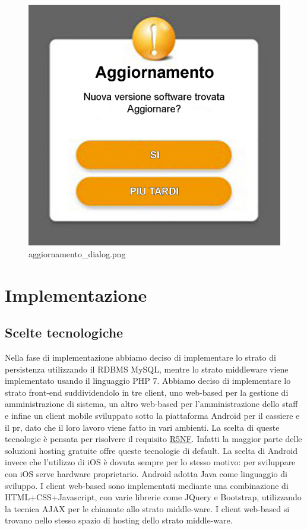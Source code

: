 \documentclass[a4paper]{article}
\begin{document}
\begin{figure}[H]
    \includegraphics[scale=0.5]{Progettazione/aggiornamento_dialog.png}
    \centering
    \caption{aggiornamento\_dialog.png}
\end{figure}


\newpage

\section{Implementazione}

\subsection{Scelte tecnologiche}

Nella fase di implementazione abbiamo deciso di implementare lo strato di persistenza utilizzando il RDBMS MySQL, mentre lo strato middleware viene implementato usando il linguaggio PHP 7. Abbiamo deciso di implementare lo strato front-end suddividendolo in tre client, uno web-based per la gestione di amministrazione di sistema, un altro web-based per l'amministrazione dello staff e infine un client mobile sviluppato sotto la piattaforma Android per il cassiere e il pr, dato che il loro lavoro viene fatto in vari ambienti. La scelta di queste tecnologie è pensata per risolvere il requisito \hyperlink{R5NF}{R5NF}. Infatti la maggior parte delle soluzioni hosting gratuite offre queste tecnologie di default. La scelta di Android invece che l'utilizzo di iOS è dovuta sempre per lo stesso motivo: per sviluppare con iOS serve hardware proprietario. Android adotta Java come linguaggio di sviluppo. I client web-based sono implementati mediante una combinazione di HTML+CSS+Javascript, con varie librerie come JQuery e Bootstrap, utilizzando la tecnica AJAX per le chiamate allo strato middle-ware. I client web-based si trovano nello stesso spazio di hosting dello strato middle-ware.
\end{document}
